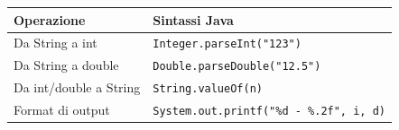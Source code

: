 \begin{table}[ht!]
\centering
\begin{tabularx}{\textwidth}{@{}lX@{}}
\toprule
\textbf{Operazione} & \textbf{Sintassi Java} \\ \midrule
Da String a int & \texttt{Integer.parseInt("123")} \\
Da String a double & \texttt{Double.parseDouble("12.5")} \\
Da int/double a String & \texttt{String.valueOf(n)} \\
Format di output & \texttt{System.out.printf("\%d - \%.2f", i, d)} \\ \bottomrule
\end{tabularx}
\end{table}